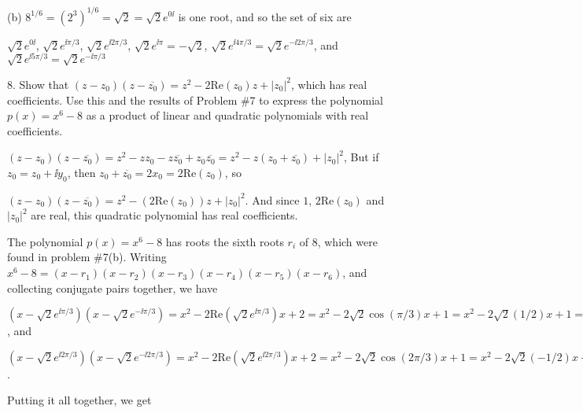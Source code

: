 \vfill\eject

\item{(b)} $8^{1/6}=(2^3)^{1/6}=\sqrt{2}=\sqrt{2}e^{0\ii}$ is one root, and so the set of six are

\ssk

\item{} $\sqrt{2}e^{0\ii}$, $\sqrt{2}e^{\ii\pi/3}$, $\sqrt{2}e^{\ii2\pi/3}$, 
$\sqrt{2}e^{\ii\pi}=-\sqrt{2}$, $\sqrt{2}e^{\ii4\pi/3}=\sqrt{2}e^{-\ii2\pi/3}$, and
$\sqrt{2}e^{\ii5\pi/3}=\sqrt{2}e^{-\ii\pi/3}$

\bsk

\item{8.} Show that $(z-z_0)(z-\overline{z_0})=z^2-2\text{Re}(z_0)z+|z_0|^2$, which has real
coefficients. Use this and the results of Problem \#7 to express the polynomial
$p(x)=x^6-8$ as a product of linear and quadratic polynomials with real coefficients.

\msk

\item{} $(z-z_0)(z-\overline{z_0})=z^2-zz_0-z\overline{z_0}+z_0\overline{z_0}=
z^2-z(z_0+\overline{z_0})+|z_0|^2$, But if
$z_0=z_0+\ii y_0$, then $z_0+\overline{z_0}=2x_0=2\text{Re}(z_0)$, so

\ssk

\item{} $(z-z_0)(z-\overline{z_0})=z^2-(2\text{Re}(z_0))z+|z_0|^2$. And since $1$, $2\text{Re}(z_0)$ and
$|z_0|^2$ are real, this quadratic polynomial has real coefficients.

\msk

\item{} The polynomial $p(x)=x^6-8$ has roots the sixth roots $r_i$ of 8, which were found in problem \#7(b).
Writing $x^6-8=(x-r_1)(x-r_2)(x-r_3)(x-r_4)(x-r_5)(x-r_6)$, and collecting conjugate pairs together, we
have

\msk

\item{} $(x-\sqrt{2}e^{\ii\pi/3})(x-\sqrt{2}e^{-\ii\pi/3})=x^2-2\text{Re}(\sqrt{2}e^{\ii\pi/3})x+2=
x^2-2\sqrt{2}\cos(\pi/3)x+1=x^2-2\sqrt{2}(1/2)x+1=x^2-\sqrt{2}x+2$, and 

\ssk

\item{} $(x-\sqrt{2}e^{\ii 2\pi/3})(x-\sqrt{2}e^{-\ii 2\pi/3})=x^2-2\text{Re}(\sqrt{2}e^{\ii 2\pi/3})x+2=
x^2-2\sqrt{2}\cos(2\pi/3)x+1=x^2-2\sqrt{2}(-1/2)x+1=x^2+\sqrt{2}x+2$.

\msk

\item{} Putting it all together, we get

